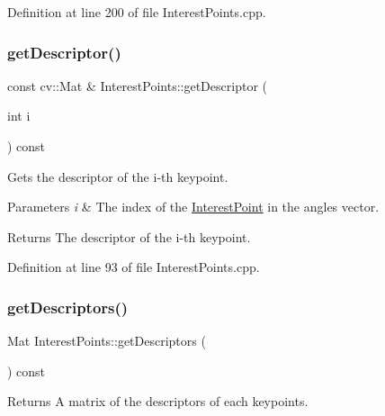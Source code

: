 Definition at line 200 of file Interest\+Points.\+cpp.

\mbox{\label{classdefals_1_1_interest_points_aafcff89fbec453aee91ff1f340a945c3}} 
\subsubsection{\texorpdfstring{get\+Descriptor()}{getDescriptor()}}
{\footnotesize\ttfamily const cv\+::\+Mat \& Interest\+Points\+::get\+Descriptor (\begin{DoxyParamCaption}\item[{int}]{i }\end{DoxyParamCaption}) const}

Gets the descriptor of the i-\/th keypoint.


\begin{DoxyParams}{Parameters}
{\em i} & The index of the \hyperlink{classdefals_1_1_interest_point}{Interest\+Point} in the angles vector.\\
\hline
\end{DoxyParams}
\begin{DoxyReturn}{Returns}
The descriptor of the i-\/th keypoint. 
\end{DoxyReturn}


Definition at line 93 of file Interest\+Points.\+cpp.

\mbox{\label{classdefals_1_1_interest_points_a8ebee884f7378641a7f94bb137af4647}} 
\subsubsection{\texorpdfstring{get\+Descriptors()}{getDescriptors()}}
{\footnotesize\ttfamily Mat Interest\+Points\+::get\+Descriptors (\begin{DoxyParamCaption}{ }\end{DoxyParamCaption}) const}

\begin{DoxyReturn}{Returns}
A matrix of the descriptors of each keypoints. 
\end{DoxyReturn}


